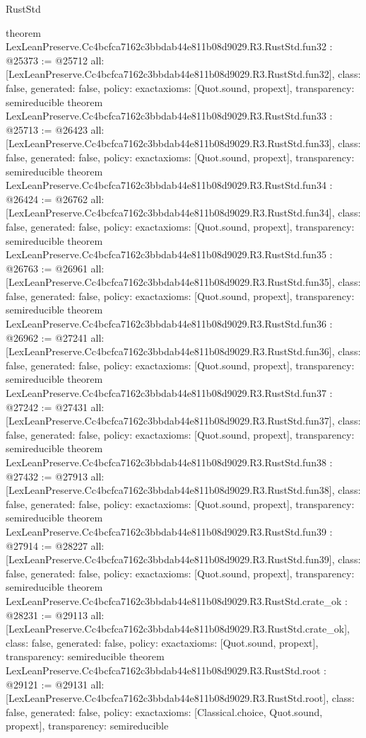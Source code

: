\begin{lexlean}{RustStd}
\begin{coremodule}
{}
theorem LexLeanPreserve.Cc4bcfca7162c3bbdab44e811b08d9029.R3.RustStd.fun32 : @25373 := @25712 {
  all: [LexLeanPreserve.Cc4bcfca7162c3bbdab44e811b08d9029.R3.RustStd.fun32],
  class: false,
  generated: false,
  policy: exact{axioms: [Quot.sound, propext]},
  transparency: semireducible
}
theorem LexLeanPreserve.Cc4bcfca7162c3bbdab44e811b08d9029.R3.RustStd.fun33 : @25713 := @26423 {
  all: [LexLeanPreserve.Cc4bcfca7162c3bbdab44e811b08d9029.R3.RustStd.fun33],
  class: false,
  generated: false,
  policy: exact{axioms: [Quot.sound, propext]},
  transparency: semireducible
}
theorem LexLeanPreserve.Cc4bcfca7162c3bbdab44e811b08d9029.R3.RustStd.fun34 : @26424 := @26762 {
  all: [LexLeanPreserve.Cc4bcfca7162c3bbdab44e811b08d9029.R3.RustStd.fun34],
  class: false,
  generated: false,
  policy: exact{axioms: [Quot.sound, propext]},
  transparency: semireducible
}
theorem LexLeanPreserve.Cc4bcfca7162c3bbdab44e811b08d9029.R3.RustStd.fun35 : @26763 := @26961 {
  all: [LexLeanPreserve.Cc4bcfca7162c3bbdab44e811b08d9029.R3.RustStd.fun35],
  class: false,
  generated: false,
  policy: exact{axioms: [Quot.sound, propext]},
  transparency: semireducible
}
theorem LexLeanPreserve.Cc4bcfca7162c3bbdab44e811b08d9029.R3.RustStd.fun36 : @26962 := @27241 {
  all: [LexLeanPreserve.Cc4bcfca7162c3bbdab44e811b08d9029.R3.RustStd.fun36],
  class: false,
  generated: false,
  policy: exact{axioms: [Quot.sound, propext]},
  transparency: semireducible
}
theorem LexLeanPreserve.Cc4bcfca7162c3bbdab44e811b08d9029.R3.RustStd.fun37 : @27242 := @27431 {
  all: [LexLeanPreserve.Cc4bcfca7162c3bbdab44e811b08d9029.R3.RustStd.fun37],
  class: false,
  generated: false,
  policy: exact{axioms: [Quot.sound, propext]},
  transparency: semireducible
}
theorem LexLeanPreserve.Cc4bcfca7162c3bbdab44e811b08d9029.R3.RustStd.fun38 : @27432 := @27913 {
  all: [LexLeanPreserve.Cc4bcfca7162c3bbdab44e811b08d9029.R3.RustStd.fun38],
  class: false,
  generated: false,
  policy: exact{axioms: [Quot.sound, propext]},
  transparency: semireducible
}
theorem LexLeanPreserve.Cc4bcfca7162c3bbdab44e811b08d9029.R3.RustStd.fun39 : @27914 := @28227 {
  all: [LexLeanPreserve.Cc4bcfca7162c3bbdab44e811b08d9029.R3.RustStd.fun39],
  class: false,
  generated: false,
  policy: exact{axioms: [Quot.sound, propext]},
  transparency: semireducible
}
theorem LexLeanPreserve.Cc4bcfca7162c3bbdab44e811b08d9029.R3.RustStd.crate_ok : @28231 := @29113 {
  all: [LexLeanPreserve.Cc4bcfca7162c3bbdab44e811b08d9029.R3.RustStd.crate_ok],
  class: false,
  generated: false,
  policy: exact{axioms: [Quot.sound, propext]},
  transparency: semireducible
}
theorem LexLeanPreserve.Cc4bcfca7162c3bbdab44e811b08d9029.R3.RustStd.root : @29121 := @29131 {
  all: [LexLeanPreserve.Cc4bcfca7162c3bbdab44e811b08d9029.R3.RustStd.root],
  class: false,
  generated: false,
  policy: exact{axioms: [Classical.choice, Quot.sound, propext]},
  transparency: semireducible
}


\end{coremodule}
\end{lexlean}
